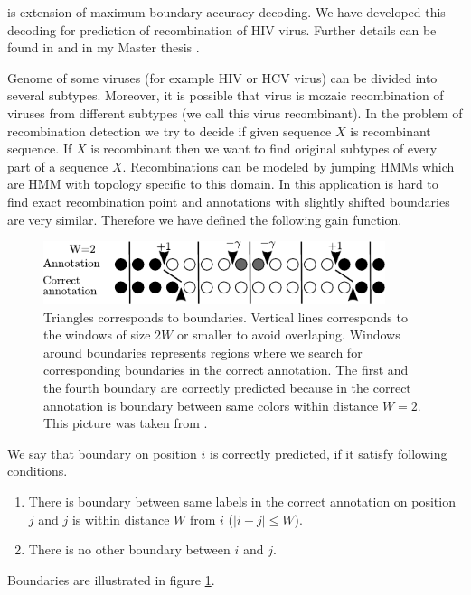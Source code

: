  is extension of maximum
boundary accuracy decoding. We have developed this decoding for prediction of
recombination of HIV virus.  Further details can be found in \cite{Nanasi2010}
and in my Master thesis \cite{Nanasi2010mgr}.


Genome of some viruses (for example HIV or HCV virus) can be divided into
several subtypes. Moreover, it is possible that virus is mozaic
recombination of viruses from different subtypes (we call this virus
recombinant). In the problem of recombination detection we try to decide if
given sequence $X$ is recombinant sequence. If $X$ is recombinant then we want to find
original subtypes of every part of a sequence $X$. Recombinations can be modeled
by jumping HMMs \cite{Schultz2006} which are HMM with topology specific to this domain.
In this application is 
hard to find exact recombination point and annotations with slightly shifted
boundaries are very similar. Therefore we have defined the following gain
function.

\begin{figure}
\begin{center}
\includegraphics[width=10cm]{../figures/HERDbuddy.pdf}
\end{center}
\caption[Highest Expected Reward Decoding explanation]{
Triangles corresponds to boundaries. Vertical lines corresponds to the windows
of size $2W$ or smaller to avoid overlaping. Windows around boundaries
represents regions where we search for corresponding boundaries in the correct
annotation.
The first and the fourth boundary are correctly predicted because in the correct
annotation is boundary between same colors within distance $W=2$.
This picture was taken from \cite{Nanasi2010mgr}.
}\label{FIGURE:HERDBUDDY}
\end{figure}

We say that boundary on position $i$ is correctly predicted, if it satisfy
following conditions.
\begin{enumerate}
\item There is boundary between same labels in the correct annotation on position $j$ and $j$ is
within distance $W$ from $i$ ($|i-j|\leq W$).
\item There is no other boundary between $i$ and $j$. 
\end{enumerate}
Boundaries are illustrated in figure \ref{FIGURE:HERDBUDDY}. 

